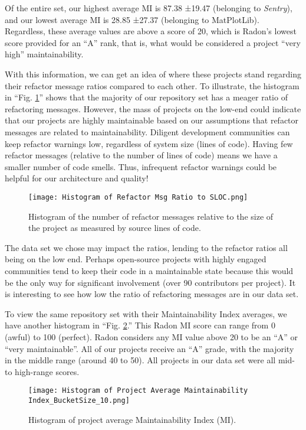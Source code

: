 Of the entire set, our highest average MI is 87.38 ±19.47 (belonging to \emph{Sentry}), and our lowest average MI is 28.85 ±27.37 (belonging to MatPlotLib). Regardless, these average values are above a score of 20, which is Radon's lowest score provided for an ``A'' rank, that is, what would be considered a project ``very high'' maintainability.

With this information, we can get an idea of where these projects stand regarding their refactor message ratios compared to each other. To illustrate, the histogram in ``Fig. \ref{figHistogramRefactorRatio}'' shows that the majority of our repository set has a meager ratio of refactoring messages. However, the mass of projects on the low-end could indicate that our projects are highly maintainable based on our assumptions that refactor messages are related to maintainability. Diligent development communities can keep refactor warnings low, regardless of system size (lines of code). Having few refactor messages (relative to the number of lines of code) means we have a smaller number of code smells. Thus, infrequent refactor warnings could be helpful for our architecture and quality!

\begin{figure}[ht]
  \centerline{
    \texttt{[image: Histogram of Refactor Msg Ratio to SLOC.png]}
  }
  \caption{Histogram of the number of refactor messages relative to the size of the project as measured by source lines of code.}
  \label{figHistogramRefactorRatio}
\end{figure}

The data set we chose may impact the ratios, lending to the refactor ratios all being on the low end. Perhaps open-source projects with highly engaged communities tend to keep their code in a maintainable state because this would be the only way for significant involvement (over 90 contributors per project). It is interesting to see how low the ratio of refactoring messages are in our data set.

To view the same repository set with their Maintainability Index averages, we have another histogram in ``Fig. \ref{figHistogramAvgMI}.'' This Radon MI score can range from 0 (awful) to 100 (perfect). Radon considers any MI value above 20 to be an ``A'' or ``very maintainable''. All of our projects receive an ``A'' grade, with the majority in the middle range (around 40 to 50). All projects in our data set were all mid-to high-range scores.

\begin{figure}[ht]
  \centerline{
    \texttt{[image: Histogram of Project Average Maintainability Index\_BucketSize\_10.png]}
  }
  \caption{Histogram of project average Maintainability Index (MI).}
  \label{figHistogramAvgMI}
\end{figure}

